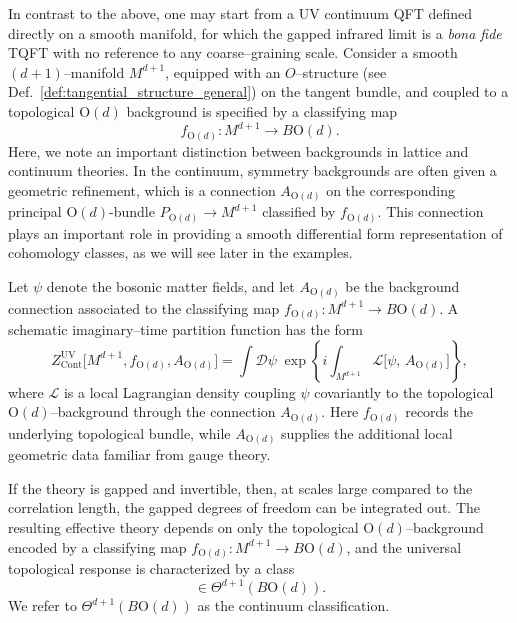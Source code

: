 \documentclass[aps,prx,reprint,superscriptaddress,twocolumn,amsmath,amssymb,amsfonts, nofootinbib]{revtex4-2}
\theoremstyle{apsstyle}
\begin{document}
In contrast to the above, one may start from a  UV continuum QFT defined directly on a smooth manifold, for which the gapped infrared limit is a \emph{bona fide} TQFT with no reference to any coarse–graining scale.
Consider a smooth $(d{+}1)$–manifold $M^{d+1}$, equipped with an $O$–structure (see Def.~\ref{def:tangential_structure_general}) on the tangent bundle, and coupled to a topological $\mathrm{O}(d)$ background is specified by a classifying map
\begin{equation*}
    f_{\mathrm{O}(d)}: M^{d+1} \longrightarrow B\mathrm{O}(d).
\end{equation*}
Here, we note an important distinction between backgrounds in lattice and continuum theories. In the continuum, symmetry backgrounds are often given a geometric refinement, which is a connection $A_{\mathrm{O}(d)}$ on the corresponding principal $\mathrm{O}(d)$-bundle $P_{\mathrm{O}(d)}\to M^{d+1}$ classified by $f_{\mathrm{O}(d)}$. This connection plays an important role in providing a smooth differential form representation of cohomology classes, as we will see later in the examples. 

Let $\psi$ denote the bosonic matter fields, and let $A_{\mathrm{O}(d)}$ be the background connection associated to the classifying map $f_{\mathrm{O}(d)}: M^{d+1}\to B\mathrm{O}(d)$. A schematic imaginary–time partition function has the form
\begin{equation}
    Z_{\mathrm{Cont}}^{\mathrm{UV}}\bigl[M^{d+1}, f_{\mathrm{O}(d)}, A_{\mathrm{O}(d)}\bigr]
    =
    \int \mathcal D\psi\;
    \exp \left\{
      i \int_{M^{d+1}} \mathcal L\bigl[\psi,\,A_{\mathrm{O}(d)}\bigr]
    \right\},
    \label{eq:PF_continuum_UV}
\end{equation}
where $\mathcal L$ is a local Lagrangian density coupling $\psi$ covariantly to the topological $\mathrm{O}(d)$–background through the connection $A_{\mathrm{O}(d)}$. Here $f_{\mathrm{O}(d)}$ records the underlying topological bundle, while $A_{\mathrm{O}(d)}$ supplies the additional local geometric data familiar from gauge theory.
\medskip

If the theory is gapped and invertible, then, at scales large compared to the correlation length, the gapped degrees of freedom can be integrated out. The resulting effective theory depends on only the topological $\mathrm{O}(d)$–background encoded by a classifying map $f_{\mathrm{O}(d)} : M^{d+1} \to B\mathrm{O}(d)$, and the universal topological response is characterized by a class
\begin{equation*}
    [x_{\mathrm{O}(d)}] \in \Theta^{d+1}(B\mathrm{O}(d)).
\end{equation*} We refer to $\Theta^{d+1}(B\mathrm{O}(d))$ as the continuum classification.
\end{document}
